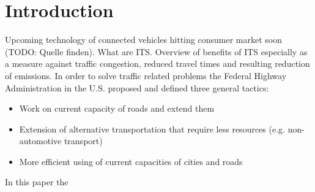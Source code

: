 \documentclass{sig-alternate}
\begin{document}
\date{22 November 2014}

\maketitle
\begin{abstract}

\end{abstract}

\keywords{}

\section{Introduction}
Upcoming technology of connected vehicles hitting consumer market soon (TODO: Quelle finden). What are ITS. Overview of benefits of ITS especially as a measure against traffic congestion, reduced travel times and resulting reduction of emissions.
In order to solve traffic related problems the Federal Highway Administration in the U.S. proposed and defined three general tactics\cite{systematics2005traffic}:
\begin{itemize}
\item Work on current capacity of roads and extend them
\item Extension of alternative transportation that require less resources (e.g. non-automotive transport)
\item More efficient using of current capacities of cities and roads
\end{itemize}
In this paper the 
\end{document}
